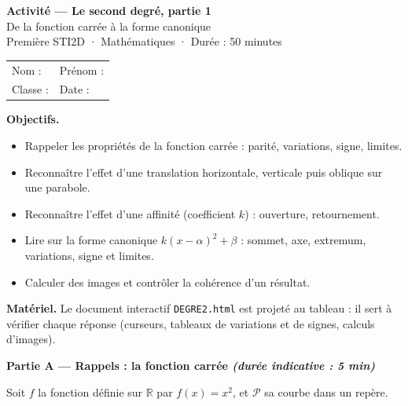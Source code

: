 \documentclass[11pt,a4paper]{article}
\newcommand{\R}{\mathbb{R}}
\newcommand{\partie}[2]{%
  \vspace{6pt}
  \noindent\colorbox{blue!12}{\parbox{\dimexpr\linewidth-2\fboxsep}{%
    \bfseries\color{blue!50!black} #1 \hfill \normalfont\small\itshape (durée indicative : #2)}}%
  \vspace{4pt}}
\begin{document}
\begin{center}
  {\Large\bfseries Activité — Le second degré, partie 1}\\[2pt]
  {\large De la fonction carrée à la forme canonique}\\[6pt]
  {\small Première STI2D · Mathématiques · Durée : 50 minutes}\\[6pt]
  \begin{tabular}{@{}p{6cm}p{6cm}@{}}
    Nom : \dotfill & Prénom : \dotfill \\[8pt]
    Classe : \dotfill & Date : \dotfill \\
  \end{tabular}
\end{center}

\begin{objbox}
\textbf{Objectifs.} 
\begin{itemize}[leftmargin=1.2em,itemsep=1pt,topsep=2pt]
  \item Rappeler les propriétés de la fonction carrée : parité, variations, signe, limites.
  \item Reconnaître l'effet d'une translation horizontale, verticale puis oblique sur une parabole.
  \item Reconnaître l'effet d'une affinité (coefficient $k$) : ouverture, retournement.
  \item Lire sur la forme canonique $k(x-\alpha)^2+\beta$ : sommet, axe, extremum, variations, signe et limites.
  \item Calculer des images et contrôler la cohérence d'un résultat.
\end{itemize}
\textbf{Matériel.} Le document interactif \texttt{DEGRE2.html} est projeté au tableau : il sert à vérifier chaque réponse (curseurs, tableaux de variations et de signes, calculs d'images).
\end{objbox}

\partie{Partie A — Rappels : la fonction carrée}{5 min}

Soit $f$ la fonction définie sur $\R$ par $f(x)=x^2$, et $\mathcal{P}$ sa courbe dans un repère.
\end{document}
